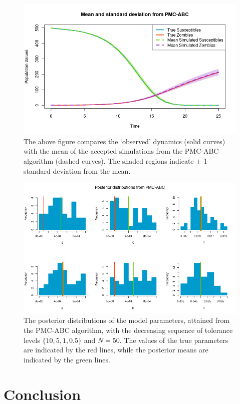 \documentclass[]{article}
\begin{document}
\begin{figure}[H]
	\centering
	\includegraphics[width=0.8\linewidth]{../Figures/PMC_ABC_sd_bands}
	\caption{The above figure compares the `observed' dynamics (solid curves) with the mean of the accepted simulations from the PMC-ABC algorithm (dashed curves). The shaded regions indicate $\pm$ 1 standard deviation from the mean.}
	\label{pmc_abc_sd}
\end{figure}

\begin{figure}[H]
	\centering
	\includegraphics[width=1\linewidth]{../Figures/PMC_posteriors}
	\caption{The posterior distributions of the model parameters, attained from the PMC-ABC algorithm, with the decreasing sequence of tolerance levels $\{ 10, 5, 1, 0.5\}$ and $N=50$. The values of the true parameters are indicated by the red lines, while the posterior means are indicated by the green lines.}
	\label{pmc_abc_posteriors}
\end{figure}

\section{Conclusion}
\end{document}
